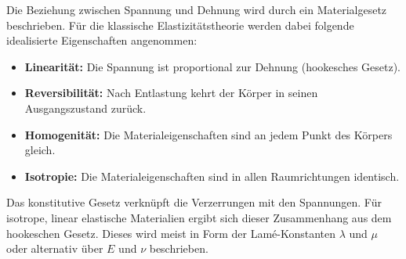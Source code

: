 Die Beziehung zwischen Spannung und Dehnung wird durch ein
Materialgesetz beschrieben.
Für die klassische Elastizitätstheorie werden dabei folgende
idealisierte Eigenschaften angenommen:
\begin{itemize}
	\item \textbf{Linearität:} Die Spannung ist proportional
	zur Dehnung (hookesches Gesetz).
	\item \textbf{Reversibilität:} Nach Entlastung kehrt der
	Körper in seinen Ausgangszustand zurück.
	\item \textbf{Homogenität:} Die Materialeigenschaften sind
	an jedem Punkt des Körpers gleich.
	\item \textbf{Isotropie:} Die Materialeigenschaften sind
	in allen Raumrichtungen identisch.
\end{itemize}

Das konstitutive Gesetz verknüpft die Verzerrungen mit den Spannungen.
Für isotrope, linear elastische Materialien ergibt sich dieser
Zusammenhang aus dem hookeschen Gesetz. Dieses wird meist in Form
der Lamé-Konstanten $\lambda$ und $\mu$ oder alternativ über $E$
und $\nu$ beschrieben.

